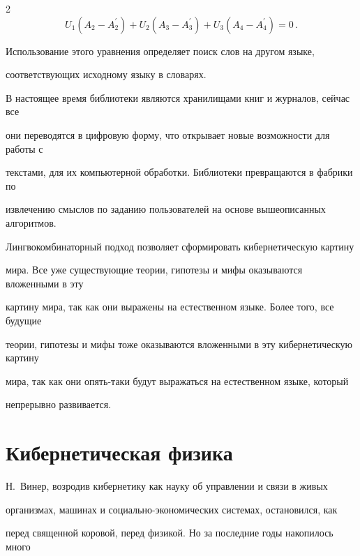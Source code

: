 \begin{multicols}{2}
\begin{equation*}


U_1(A_2-A_2^\prime)+U_2(A_3-A_3^\prime)+U_3(A_4-A_4^\prime)=0\,.




\end{equation*}


      Использование этого уравнения определяет поиск слов на другом языке, 


соответствующих исходному языку в словарях. 


      


      В настоящее время библиотеки являются хранилищами книг и журналов, сейчас все 


они переводятся в цифровую форму, что открывает новые возможности для работы с 


текстами, для их компьютерной обработки. Библиотеки превращаются в фабрики по 


извлечению смыслов по заданию пользователей на основе вышеописанных алгоритмов.


      


      Лингвокомбинаторный подход позволяет сформировать кибернетическую картину 


мира. Все уже существующие теории, гипотезы и мифы оказываются вложенными в эту 


картину мира, так как они выражены на естественном языке. Более того, все будущие 


теории, гипотезы и мифы тоже оказываются вложенными в эту кибернетическую картину 


мира, так как они опять-та\-ки будут выражаться на естественном языке, который 


непрерывно развивается. 





\section{Кибернетическая физика}





     Н.~Винер, возродив кибернетику как науку об управлении и связи в живых 


организмах, машинах и со\-ци\-аль\-но-эко\-но\-ми\-че\-ских сис\-те\-мах, остановился, как 


перед священной коровой, перед физикой. Но за последние годы накопилось много 



\end{multicols}
